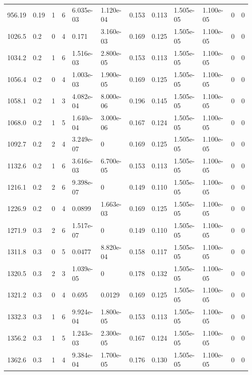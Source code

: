 \documentclass[preview]{standalone}
\begin{document}
{{{\begin{tabular}{L{1.2cm}C{1.2cm} C{0.3cm}C{0.5cm} C{1.4cm}C{1.4cm} C{1.4cm}C{1.4cm} C{1.6cm}C{1.6cm} C{1.6cm}C{1.6cm}}
  956.19  &  0.19  & 1     &  6 &  6.035e-03  & 1.120e-04  &  0.153&   0.113& 1.505e-05 & 1.100e-05   &  0 & 0  \\ 
  1026.5  &   0.2  & 0     &  4 &  0.171  & 3.160e-03  &  0.169&   0.125& 1.505e-05 & 1.100e-05   &  0 & 0  \\ 
  1034.2  &   0.2  & 1     &  6 &  1.516e-03  & 2.800e-05  &  0.153&   0.113& 1.505e-05 & 1.100e-05   &  0 & 0  \\ 
  1056.4  &   0.2  & 0     &  4 &  1.003e-03  & 1.900e-05  &  0.169&   0.125& 1.505e-05 & 1.100e-05   &  0 & 0  \\ 
  1058.1  &   0.2  & 1     &  3 &  4.082e-04  & 8.000e-06  &  0.196&   0.145& 1.505e-05 & 1.100e-05   &  0 & 0  \\ 
  1068.0  &   0.2  & 1     &  5 &  1.640e-04  & 3.000e-06  &  0.167&   0.124& 1.505e-05 & 1.100e-05   &  0 & 0  \\ 
  1092.7  &   0.2  & 2     &  4 &  3.249e-07  & 0  &  0.169&   0.125& 1.505e-05 & 1.100e-05   &  0 & 0  \\ 
  1132.6  &   0.2  & 1     &  6 &  3.616e-03  & 6.700e-05  &  0.153&   0.113& 1.505e-05 & 1.100e-05   &  0 & 0  \\ 
  1216.1  &   0.2  & 2     &  6 &  9.398e-07  & 0  &  0.149&   0.110& 1.505e-05 & 1.100e-05   &  0 & 0  \\ 
  1226.9  &   0.2  & 0     &  4 &  0.0899  & 1.663e-03  &  0.169&   0.125& 1.505e-05 & 1.100e-05   &  0 & 0  \\ 
  1271.9  &   0.3  & 2     &  6 &  1.517e-07  & 0  &  0.149&   0.110& 1.505e-05 & 1.100e-05   &  0 & 0  \\ 
  1311.8  &   0.3  & 0     &  5 &  0.0477  & 8.820e-04  &  0.158&   0.117& 1.505e-05 & 1.100e-05   &  0 & 0  \\ 
  1320.5  &   0.3  & 2     &  3 &  1.039e-05  & 0  &  0.178&   0.132& 1.505e-05 & 1.100e-05   &  0 & 0  \\ 
  1321.2  &   0.3  & 0     &  4 &  0.695  & 0.0129  &  0.169&   0.125& 1.505e-05 & 1.100e-05   &  0 & 0  \\ 
  1332.3  &   0.3  & 1     &  6 &  9.924e-04  & 1.800e-05  &  0.153&   0.113& 1.505e-05 & 1.100e-05   &  0 & 0  \\ 
  1356.2  &   0.3  & 1     &  5 &  1.243e-03  & 2.300e-05  &  0.167&   0.124& 1.505e-05 & 1.100e-05   &  0 & 0  \\ 
  1362.6  &   0.3  & 1     &  4 &  9.384e-04  & 1.700e-05  &  0.176&   0.130& 1.505e-05 & 1.100e-05   &  0 & 0  \\ 

\end{tabular}}}}
\end{document}
